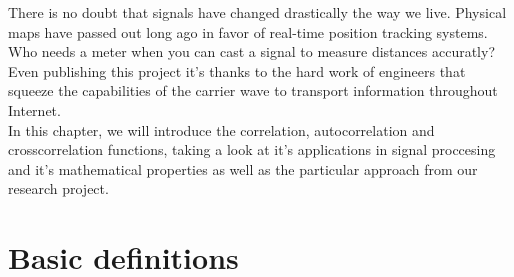 There is no doubt that signals have changed drastically the way we live.
Physical maps have passed out long ago in favor of real-time position tracking
systems. Who needs a meter when you can cast a signal to measure distances
accuratly? Even publishing this project it's thanks to the hard work of
engineers that squeeze the capabilities of the carrier wave to transport
information throughout Internet. \\

In this chapter, we will introduce the correlation, autocorrelation and
crosscorrelation functions, taking a look at it's applications in signal
proccesing and it's mathematical properties as well as the particular approach
from our research project.

\section{Basic definitions}

